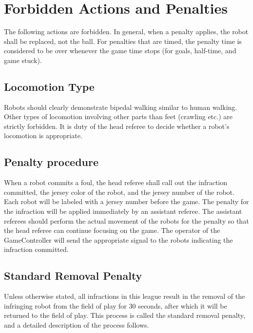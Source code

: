 \documentclass[12pt]{article}
\begin{document}
\section{Forbidden Actions and Penalties}
\label{sec:forbidden_act}

The following actions are forbidden. In general, when a penalty applies, the robot shall be replaced, not the ball. For penalties that are timed, the penalty time is considered to be over whenever the game time stops (for goals, half-time, and game stuck).

\subsection{Locomotion Type}
\label{sec:locomotion_type}

Robots should clearly demonstrate bipedal walking similar to human walking. Other types of locomotion involving other parts than feet (crawling etc.) are strictly forbidden. It is duty of the head referee to decide whether a robot's locomotion is appropriate.

\subsection{Penalty procedure}
\label{sec:penalty_procedure}

When a robot commits a foul, the head referee shall call out the infraction committed, the jersey color of the robot, and the jersey number of the robot. Each robot will be labeled with a jersey number before the game. The penalty for the infraction will be applied immediately by an assistant referee. The assistant referees should perform the actual movement of the robots for the penalty so that the head referee can continue focusing on the game. The operator of the GameController will send the appropriate signal to the robots indicating the infraction committed.

\subsection{Standard Removal Penalty}
\label{sec:removal_penalty}

Unless otherwise stated, all infractions in this league result in the removal of the infringing robot from the field of play for 30 seconds, after which it will be returned to the field of play. This process is called the standard removal penalty, and a detailed description of the process follows.
\end{document}
